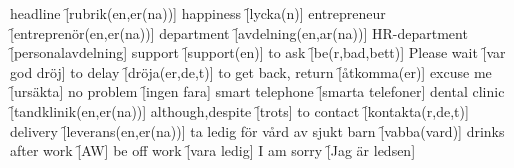 \begin{questions}
\begin{multicols}{2}
        \question headline \f[rubrik(en,er(na))]
        \question happiness \f[lycka(n)]
        \question entrepreneur \f[entreprenör(en,er(na))]
        \question department \f[avdelning(en,ar(na))]
        \question HR-department \f[personalavdelning]
        \question support \f[support(en)]
        \question to ask \f[be(r,bad,bett)]
        \question Please wait \f[var god dröj]
        \question to delay \f[dröja(er,de,t)]
        \question to get back, return \f[åtkomma(er)]
        \question excuse me \f[ursäkta]
        \question no problem \f[ingen fara]
        \question smart telephone \f[smarta telefoner]
        \question dental clinic \f[tandklinik(en,er(na))]
        \question although,despite \f[trots]
        \question to contact \f[kontakta(r,de,t)]
        \question delivery \f[leverans(en,er(na))]
        \question ta ledig för vård av sjukt barn \f[vabba(vard)]
        \question drinks after work \f[AW]
        \question be off work \f[vara ledig]
        \question I am sorry \f[Jag är ledsen]
    \end{multicols}
\end{questions}
